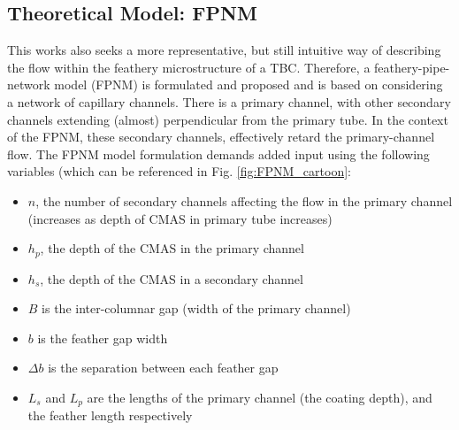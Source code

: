 \documentclass[%
 aip,
 amsmath,amssymb,
 reprint,%
]{revtex4-1}
\begin{document}

\subsection{Theoretical Model: FPNM}
\label{sec:pipeNetworkMethod}
This works also seeks a more representative, but still intuitive way of describing the flow within the feathery microstructure of a TBC. Therefore, a feathery-pipe-network model (FPNM)  is formulated and proposed and is based on considering a network of capillary channels. There is a primary channel, with other secondary channels extending (almost) perpendicular from the primary tube. In the context of the FPNM, these secondary channels, effectively retard the primary-channel flow. The FPNM model formulation demands added input using the following variables (which can be referenced in Fig. \ref{fig:FPNM_cartoon}:

\begin{itemize}
    \item $n$, the number of secondary channels affecting the flow in the primary channel (increases as depth of CMAS in primary tube increases)
    \item $h_{p}$, the depth of the CMAS in the primary channel
    \item $h_{s}$, the depth of the CMAS in a secondary channel
    \item $B$ is the inter-columnar gap (width of the primary channel)
    \item $b$ is the feather gap width
    \item $\Delta b$ is the separation between each feather gap
    \item $L_{s}$ and $L_{p}$ are the lengths of the primary channel (the coating depth), and the feather length respectively
\end{itemize}
\end{document}
